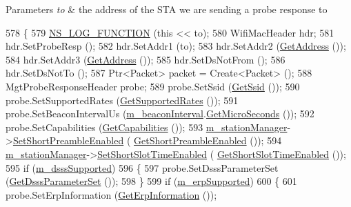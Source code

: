 \begin{DoxyParams}{Parameters}
{\em to} & the address of the S\+TA we are sending a probe response to \\
\hline
\end{DoxyParams}

\begin{DoxyCode}
578 \{
579   \hyperlink{log-macros-disabled_8h_a90b90d5bad1f39cb1b64923ea94c0761}{NS\_LOG\_FUNCTION} (\textcolor{keyword}{this} << to);
580   WifiMacHeader hdr;
581   hdr.SetProbeResp ();
582   hdr.SetAddr1 (to);
583   hdr.SetAddr2 (\hyperlink{classns3_1_1RegularWifiMac_aea719a7d05fbc664c50479fc900777b7}{GetAddress} ());
584   hdr.SetAddr3 (\hyperlink{classns3_1_1RegularWifiMac_aea719a7d05fbc664c50479fc900777b7}{GetAddress} ());
585   hdr.SetDsNotFrom ();
586   hdr.SetDsNotTo ();
587   Ptr<Packet> packet = Create<Packet> ();
588   MgtProbeResponseHeader probe;
589   probe.SetSsid (\hyperlink{classns3_1_1RegularWifiMac_a3cd4316ccd72111fa94f7091d4deb521}{GetSsid} ());
590   probe.SetSupportedRates (\hyperlink{classns3_1_1ApWifiMac_a3d1278fa6624859d50b4ed984125de30}{GetSupportedRates} ());
591   probe.SetBeaconIntervalUs (\hyperlink{classns3_1_1ApWifiMac_a798e9c63c2c85d0973fd1456ffdd38e3}{m\_beaconInterval}.\hyperlink{classns3_1_1Time_a2542b9273c336da11fcaf54e8bc6e4c8}{GetMicroSeconds} ());
592   probe.SetCapabilities (\hyperlink{classns3_1_1ApWifiMac_a5794cfc6ec6c72f335b36f302a83178a}{GetCapabilities} ());
593   \hyperlink{classns3_1_1RegularWifiMac_a76d1a5e27b64bfe36f24a55d1eea2775}{m\_stationManager}->\hyperlink{classns3_1_1WifiRemoteStationManager_a66a2f347bbc24c14a38da8dc56781cc8}{SetShortPreambleEnabled} (
      \hyperlink{classns3_1_1ApWifiMac_a19ae41add0c00c244c7a66adf523b445}{GetShortPreambleEnabled} ());
594   \hyperlink{classns3_1_1RegularWifiMac_a76d1a5e27b64bfe36f24a55d1eea2775}{m\_stationManager}->\hyperlink{classns3_1_1WifiRemoteStationManager_a127fb3ed96ad66f647c1fa3dc616e274}{SetShortSlotTimeEnabled} (
      \hyperlink{classns3_1_1ApWifiMac_abc972d9a628f6b50b27a05b1e464bbcd}{GetShortSlotTimeEnabled} ());
595   \textcolor{keywordflow}{if} (\hyperlink{classns3_1_1RegularWifiMac_ab6ce267a1e23e9c1d84908e07831bd6d}{m\_dsssSupported})
596     \{
597       probe.SetDsssParameterSet (\hyperlink{classns3_1_1ApWifiMac_a577723413f2a747d71ed01d8646ccc79}{GetDsssParameterSet} ());
598     \}
599   \textcolor{keywordflow}{if} (\hyperlink{classns3_1_1RegularWifiMac_ab90230e9a9ea6331758a53a316ee2b38}{m\_erpSupported})
600     \{
601       probe.SetErpInformation (\hyperlink{classns3_1_1ApWifiMac_ae88a116a1cdc0895105765b2c27e2f1a}{GetErpInformation} ());

\end{DoxyCode}
